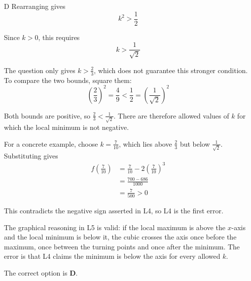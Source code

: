 \documentclass[11pt,a4paper]{article}
\begin{document}
\begin{enumerate}[label=\textbf{\arabic*.},leftmargin=*,itemsep=0pt,start=16]
\begin{djsSolution}{D}
Rearranging gives
\[
k^2>\frac12
\]

Since $k>0$, this requires
\[
k>\frac1{\sqrt2}
\]

The question only gives $k>\frac23$, which does not guarantee this stronger condition. To compare the two bounds, square them:
\[
\left(\frac23\right)^2=\frac49<\frac12=\left(\frac1{\sqrt2}\right)^2
\]

Both bounds are positive, so $\frac23<\frac1{\sqrt2}$. There are therefore allowed values of $k$ for which the local minimum is not negative.

For a concrete example, choose $k=\frac7{10}$, which lies above $\frac23$ but below $\frac1{\sqrt2}$. Substituting gives
\[
\begin{aligned}
f\left(\frac7{10}\right)
&=\frac7{10}-2\left(\frac7{10}\right)^3\\[5pt]
&=\frac{700-686}{1000}\\[5pt]
&=\frac7{500}>0
\end{aligned}
\]

This contradicts the negative sign asserted in L4, so L4 is the first error.

The graphical reasoning in L5 is valid: if the local maximum is above the $x$-axis and the local minimum is below it, the cubic crosses the axis once before the maximum, once between the turning points and once after the minimum. The error is that L4 claims the minimum is below the axis for every allowed $k$.

The correct option is \textbf{D}.
\end{djsSolution}
\end{enumerate}
\clearpage
\thispagestyle{djssolutions}
\vspace*{8pt}
\end{document}
